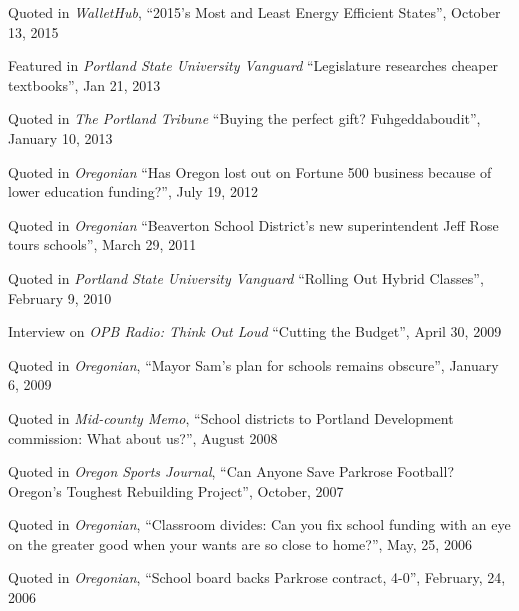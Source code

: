 \documentclass[Computer Science]{vita}
\begin{document}
\begin{vita}
\begin{Presentations and Invited Talks}
  \end{Presentations and Invited Talks}



  \begin{Media Outreach}
  
  \item Quoted in \emph{WalletHub}, ``2015’s Most and Least Energy Efficient States'', October 13, 2015
  
  \item Featured in \emph{Portland State University Vanguard} ``Legislature researches cheaper textbooks'', Jan 21, 2013
  
  \item Quoted in \emph{The Portland Tribune} ``Buying the perfect gift? Fuhgeddaboudit'', January 10, 2013
  
\item Quoted in \emph{Oregonian} ``Has Oregon lost out on Fortune 500 business because of lower education funding?'', July 19, 2012

\item Quoted in \emph{Oregonian} ``Beaverton School District's new superintendent Jeff Rose tours schools'', March 29, 2011
  
  \item Quoted in \emph{Portland State University Vanguard} ``Rolling Out Hybrid Classes'', February 9, 2010
  
  \item Interview on \emph{OPB Radio: Think Out Loud} ``Cutting the
    Budget'', April 30, 2009

  \item Quoted in \emph{Oregonian}, ``Mayor Sam's plan for schools
    remains obscure'', January 6, 2009

  \item Quoted in \emph{Mid-county Memo}, ``School districts to
    Portland Development commission: What about us?'', August 2008

  \item Quoted in \emph{Oregon Sports Journal}, ``Can Anyone Save
    Parkrose Football?  Oregon's Toughest Rebuilding Project'',
    October, 2007

  \item Quoted in \emph{Oregonian}, ``Classroom divides: Can you fix
    school funding with an eye on the greater good when your wants are
    so close to home?'', May, 25, 2006

  \item Quoted in \emph{Oregonian}, ``School board backs Parkrose
    contract, 4-0'', February, 24, 2006


\end{Media Outreach}
\end{vita}
\end{document}
